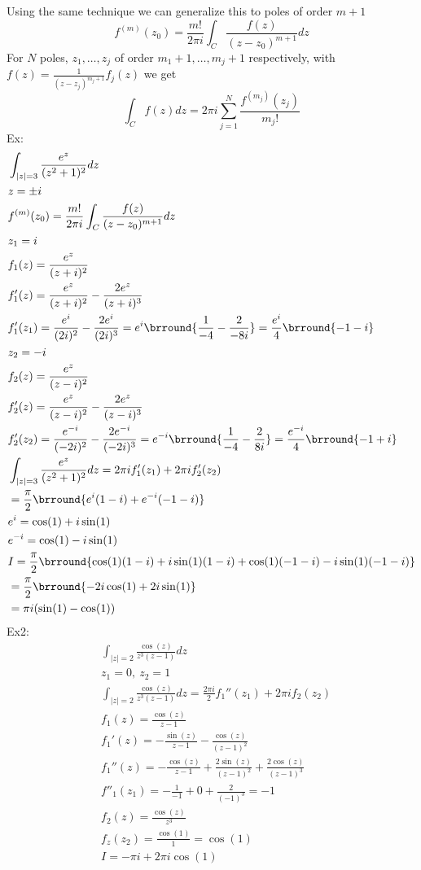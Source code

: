 Using the same technique we can generalize this to poles of order $m+1$
\[f^{(m)}(z_0)=\frac{m!}{2\pi i}\int_C\frac{f(z)}{(z-z_0)^{m+1}}dz\]
For $N$ poles, $z_1,\ldots,z_j$ of order $m_1+1,\ldots,m_j+1$ respectively, with $f(z)=\frac{1}{(z-z_j)^{m_j+1}}f_j(z)$ we get
\[\int_Cf(z)dz=2\pi i\sum_{j=1}^N\frac{f^{(m_j)}(z_j)}{m_j!}\]
Ex:
\begin{align*}
    &\int_{|z|=3}\frac{e^z}{(z^2+1)^2}dz\\
    &z=\pm i\\
    &f^{(m)}(z_0)=\frac{m!}{2\pi i}\int_C\frac{f(z)}{(z-z_0)^{m+1}}dz\\
    &z_1=i\\
    &f_1(z)=\frac{e^z}{(z+i)^2}\\
    &f_1'(z)=\frac{e^z}{(z+i)^2}-\frac{2e^z}{(z+i)^3}\\
    &f_1'(z_1)=\frac{e^i}{(2i)^2}-\frac{2e^{i}}{(2i)^3}=e^i\brround{\frac{1}{-4}-\frac{2}{-8i}}=\frac{e^i}{4}\brround{-1-i}\\
    &z_2=-i\\
    &f_2(z)=\frac{e^z}{(z-i)^2}\\
    &f_2'(z)=\frac{e^z}{(z-i)^2}-\frac{2e^z}{(z-i)^3}\\
    &f_2'(z_2)=\frac{e^{-i}}{(-2i)^2}-\frac{2e^{-i}}{(-2i)^3}=e^{-i}\brround{\frac{1}{-4}-\frac{2}{8i}}=\frac{e^{-i}}{4}\brround{-1+i}\\
    &\int_{|z|=3}\frac{e^z}{(z^2+1)^2}dz=2\pi if_1'(z_1)+2\pi if_2'(z_2)\\
    &=\frac{\pi}{2}\brround{e^i(1-i)+e^{-i}(-1-i)}\\
    &e^i=\cos(1)+i\sin(1)\\
    &e^{-i}=\cos(1)-i\sin(1)\\
    &I=\frac{\pi}{2}\brround{\cos(1)(1-i)+i\sin(1)(1-i)+\cos(1)(-1-i)-i\sin(1)(-1-i)}\\
    &=\frac{\pi}{2}\brround{-2i\cos(1)+2i\sin(1)}\\
    &=\pi i(\sin(1)-\cos(1))
\end{align*}
Ex2:
\begin{align*}
    &\int_{|z|=2}\frac{\cos(z)}{z^3(z-1)}dz\\
    &z_1=0,\ z_2=1\\
    &\int_{|z|=2}\frac{\cos(z)}{z^3(z-1)}dz=\frac{2\pi i}{2}f_1''(z_1)+2\pi if_2(z_2)\\
    &f_1(z)=\frac{\cos(z)}{z-1}\\
    &f_1'(z)=-\frac{\sin(z)}{z-1}-\frac{\cos(z)}{(z-1)^2}\\
    &f_1''(z)=-\frac{\cos(z)}{z-1}+\frac{2\sin(z)}{(z-1)^2}+\frac{2\cos(z)}{(z-1)^3}\\
    &f''_1(z_1)=-\frac{1}{-1}+0+\frac{2}{(-1)^3}=-1\\
    &f_2(z)=\frac{\cos(z)}{z^3}\\
    &f_z(z_2)=\frac{\cos(1)}{1}=\cos(1)\\
    &I=-\pi i+2\pi i\cos(1)
\end{align*}
